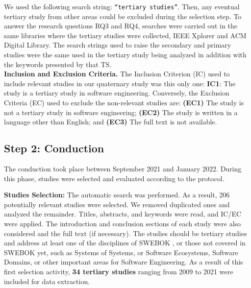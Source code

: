 \documentclass[sigconf]{acmart}
\begin{document}
We used the following search string: \texttt{``tertiary studies''}. %
Then, any eventual tertiary study from other areas could be excluded during the selection step. To answer the research questions RQ3 and RQ4, searches were carried out in the same libraries where the tertiary studies were collected, IEEE Xplorer and ACM Digital Library. The search strings used to raise the secondary and primary studies were the same used in the tertiary study being analyzed in addition with the keywords presented by that TS.
\\
\textbf{Inclusion and Exclusion Criteria.} The Inclusion Criterion (IC) used to include relevant studies in our quaternary study was this only one: \textbf{IC1}: The study is a tertiary study in software engineering. Conversely, the Exclusion Criteria (EC) used to exclude the non-relevant studies are: \textbf{(EC1)} The study is not a tertiary study in software engineering; \textbf{(EC2)} The study is written in a language other than English; and \textbf{(EC3)} The full text is not available.

\subsection{Step 2: Conduction}

The conduction took place between September 2021 and January 2022. During this phase, studies were selected and evaluated according to the protocol.

\textbf{Studies Selection:} The automatic search was performed. As a result, 206 potentially relevant studies were selected. We removed duplicated ones and analyzed the remainder. Titles, abstracts, and keywords were read, and IC/EC were applied. The introduction and conclusion sections of each study were also considered and the full text (if necessary). The studies should be tertiary studies and address at least one of the disciplines of SWEBOK \cite{SWEBOK2004}, or those not covered in SWEBOK yet, such as Systems of Systems, or Software Ecosystems, Software Domains, or other important areas for Software Engineering. %
As a result of this first selection activity, \textbf{34 tertiary studies} ranging from 2009 to 2021 were included for data extraction.
\end{document}
